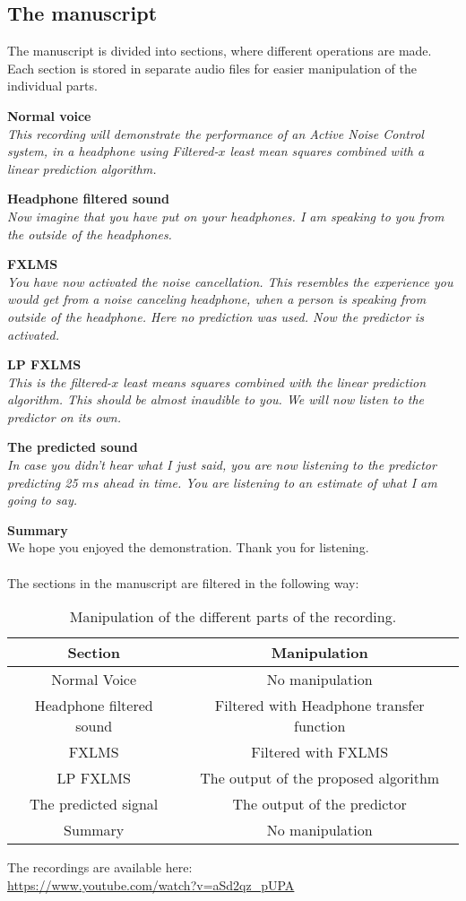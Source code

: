 \subsection{The manuscript}
The manuscript is divided into sections, where different operations are made. Each section is stored in separate audio files for easier manipulation of the individual parts. 
 
\textbf{Normal voice}\\
\textit{This recording will demonstrate the performance of an Active Noise Control  system, in a headphone using Filtered-$x$ least mean squares combined with a linear prediction algorithm.} 

\textbf{Headphone filtered sound}\\
\textit{Now imagine that you have put on your headphones. I am speaking to you from the outside of the headphones.}

\textbf{FXLMS}\\
\textit{You have now activated the noise cancellation. This resembles the experience you would get from a noise canceling headphone, when a person is speaking from outside of the headphone. 
Here no prediction was used. Now the predictor is activated. }

\textbf{LP FXLMS}\\
\textit{This is the filtered-$x$ least means squares combined with the linear prediction algorithm. This should be almost inaudible to you. We will now listen to the predictor on its own.}

\textbf{The predicted sound}\\
\textit{In case you didn't hear what I just said, you are now listening to the predictor predicting 25 $m$s ahead in time. You are listening to an estimate of what I am going to say.}

\textbf{Summary}\\
We hope you enjoyed the demonstration. Thank you for listening.\\\\

The sections in the manuscript are filtered in the following way:
\begin{table}[H]
	\centering
	\begin{tabular}{ c c } \toprule
		{Section}				& {Manipulation} \\ \bottomrule 
		Normal Voice			& No manipulation  	\\
		Headphone filtered sound& Filtered with Headphone transfer function \\
		FXLMS					& Filtered with FXLMS	\\
		LP FXLMS 				& The output of the proposed algorithm	\\
		The predicted signal 	& The output of the predictor	\\
		Summary 				& No manipulation	\\
		\bottomrule
	\end{tabular}
	\caption{Manipulation of the different parts of the recording.}
	\label{tab:VoiceRecSections}
\end{table}

The recordings are available here: \\
\url{https://www.youtube.com/watch?v=aSd2qz_pUPA} 













